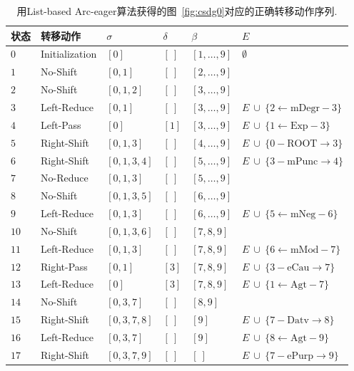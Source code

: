 \begin{table}[thbp]
	\centering
	\small
	\begin{tabular}{C{2em}L{7em}R{4em}C{4em}L{4em}L{9em}}
		\hline
		\bf 状态 & \bf 转移动作 & $\sigma$ & $\delta$ & $\beta$ & $E$ \\
		\hline
		$0$ & Initialization & $[0]$ & $[\ ]$ & $[1, \dots, 9]$ & $\emptyset $ \\
		$1$ & No-Shift & $[0, 1]$ & $[\ ]$ & $[2, \dots, 9]$ &  \\
		$2$ & No-Shift & $[0, 1, 2]$ & $[\ ]$ & $[3, \dots, 9]$ &  \\
		$3$ & Left-Reduce & $[0, 1]$ & $[\ ]$ & $[3, \dots, 9]$ & $E\ \cup\ \{2\leftarrow \textrm{mDegr}-3\}$ \\
		$4$ & Left-Pass & $[0]$ & $[1]$ & $[3, \dots, 9]$ & $E\ \cup\ \{1\leftarrow \textrm{Exp}-3\}$ \\
		$5$ & Right-Shift & $[0, 1, 3]$ & $[\ ]$ & $[4, \dots, 9]$ & $E\ \cup\ \{0- \textrm{ROOT}\rightarrow 3\}$ \\
		$6$ & Right-Shift & $[0, 1, 3, 4]$ & $[\ ]$ & $[5, \dots, 9]$ & $E\ \cup\ \{3- \textrm{mPunc}\rightarrow 4\}$ \\
		$7$ & No-Reduce & $[0, 1, 3]$ & $[\ ]$ & $[5, \dots, 9]$ &  \\
		$8$ & No-Shift & $[0, 1, 3, 5]$ & $[\ ]$ & $[6, \dots, 9]$ &  \\
		$9$ & Left-Reduce & $[0, 1, 3]$ & $[\ ]$ & $[6, \dots, 9]$ & $E\ \cup\ \{5\leftarrow \textrm{mNeg}-6\}$ \\
		$10$ & No-Shift & $[0, 1, 3, 6]$ & $[\ ]$ & $[7, 8, 9]$ &  \\
		$11$ & Left-Reduce & $[0, 1, 3]$ & $[\ ]$ & $[7, 8, 9]$ & $E\ \cup\ \{6\leftarrow \textrm{mMod}-7\}$ \\
		$12$ & Right-Pass & $[0, 1]$ & $[3]$ & $[7, 8, 9]$ & $E\ \cup\ \{3- \textrm{eCau}\rightarrow 7\}$ \\
		$13$ & Left-Reduce & $[0]$ & $[3]$ & $[7, 8, 9]$ & $E\ \cup\ \{1\leftarrow \textrm{Agt}-7\}$ \\
		$14$ & No-Shift & $[0, 3, 7]$ & $[\ ]$ & $[8, 9]$ &  \\
		$15$ & Right-Shift & $[0, 3, 7, 8]$ & $[\ ]$ & $[9]$ & $E\ \cup\ \{7- \textrm{Datv}\rightarrow 8\}$ \\
		$16$ & Left-Reduce & $[0, 3, 7]$ & $[\ ]$ & $[9]$ & $E\ \cup\ \{8\leftarrow \textrm{Agt}-9\}$ \\
		$17$ & Right-Shift & $[0, 3, 7, 9]$ & $[\ ]$ & $[\ ]$ & $E\ \cup\ \{7- \textrm{ePurp}\rightarrow 9\}$ \\
		\hline
	\end{tabular}
	\caption{用List-based Arc-eager算法获得的图~\ref{fig:csdg0}对应的正确转移动作序列.}
	\label{tbl:trans-seq}
	\vspace{-1em}
\end{table}

